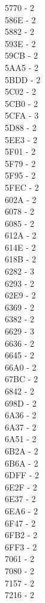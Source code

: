\documentclass[10pt,letterpaper]{article}
\begin{document}
\begin{multicols}{5}
5770 -  2\\
586E -  2\\
5882 -  2\\
593E -  2\\
59CB -  2\\
5AA5 -  2\\
5BDD -  2\\
5C02 -  2\\
5CB0 -  2\\
5CFA -  3\\
5D88 -  2\\
5EE3 -  2\\
5F01 -  2\\
5F79 -  2\\
5F95 -  2\\
5FEC -  2\\
602A -  2\\
6078 -  2\\
6085 -  2\\
612A -  2\\
614E -  2\\
618B -  2\\
6282 -  3\\
6293 -  2\\
62E9 -  2\\
6369 -  2\\
6382 -  2\\
6629 -  3\\
6636 -  2\\
6645 -  2\\
66A0 -  2\\
67BC -  2\\
6842 -  2\\
698D -  2\\
6A36 -  2\\
6A37 -  2\\
6A51 -  2\\
6B2A -  2\\
6B6A -  2\\
6DFF -  2\\
6E2F -  2\\
6E37 -  2\\
6EA6 -  2\\
6F47 -  2\\
6FB2 -  2\\
6FF3 -  2\\
7061 -  2\\
7080 -  2\\
7157 -  2\\
7216 -  2\\

\end{multicols}
\end{document}
